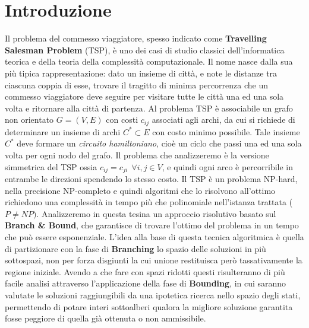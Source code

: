 \documentclass[
	article,			%
	12pt,				%
	oneside,			%
	a4paper,			%
	english,			%
	italian,				%
	sumario=tradicional,
	]{abntex2}
\begin{document}
\section{Introduzione}
Il problema del commesso viaggiatore, spesso indicato come \textbf{Travelling Salesman Problem} (TSP), è uno dei casi di studio classici dell'informatica teorica e della teoria della complessità computazionale. Il nome nasce dalla sua più tipica rappresentazione: dato un insieme di città, e note le distanze tra ciascuna coppia di esse, trovare il tragitto di minima percorrenza che un commesso viaggiatore deve seguire per visitare tutte le città una ed una sola volta e ritornare alla città di partenza. Al problema TSP è associabile un grafo non orientato $G=(V,E)$ con costi $c_{ij}$ associati agli archi, da cui si richiede di determinare un insieme di archi $C^* \subset E$ con costo minimo possibile. Tale insieme $C^*$ deve formare un \textit{circuito hamiltoniano}, cioè un ciclo che passi una ed una sola volta per ogni nodo del grafo. Il problema che analizzeremo è la versione simmetrica del TSP ossia $c_{ij} = c_{ji} \:\: \forall i,j \in V$, e quindi ogni arco è percorribile in entrambe le direzioni spendendo lo stesso costo.
\newline
Il TSP è un problema NP-hard, nella precisione NP-completo e quindi algoritmi che lo risolvono all'ottimo richiedono una complessità in tempo più che polinomiale nell'istanza trattata ($P \neq NP)$.
\newline
Analizzeremo in questa tesina un approccio risolutivo basato sul \textbf{Branch \& Bound}, che garantisce di trovare l'ottimo del problema in un tempo che può essere esponenziale. L'idea alla base di questa tecnica algoritmica è quella di partizionare con la fase di \textbf{Branching} lo spazio delle soluzioni in più sottospazi, non per forza disgiunti la cui unione restituisca però tassativamente la regione iniziale. Avendo a che fare con spazi ridotti questi risulteranno di più facile analisi attraverso l'applicazione della fase di \textbf{Bounding}, in cui saranno valutate le soluzioni raggiungibili da una ipotetica ricerca nello spazio degli stati, permettendo di potare interi sottoalberi qualora la migliore soluzione garantita fosse peggiore di quella già ottenuta o non ammissibile.
\end{document}
